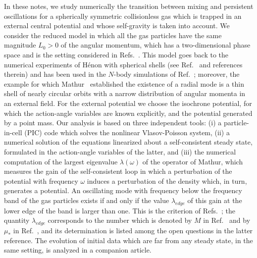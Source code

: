 In these notes, we study numerically the transition between mixing and persistent oscillations for a spherically symmetric collisionless gas which is trapped in an external central potential and whose self-gravity is taken into account. We consider the reduced model in which all the gas particles have the same magnitude $L_0 > 0$ of the angular momentum, which has a two-dimensional phase space and is the setting considered in Refs.~\cite{pRoS20,mHgRmScS25}. This model goes back to the numerical experiments of H\'enon with spherical shells (see Ref.~\cite{mH73} and references therein) and has been used in the $N$-body simulations of Ref.~\cite{pKbM02}; moreover, the example for which Mathur~\cite{sM90} established the existence of a radial mode is a thin shell of nearly circular orbits with a narrow distribution of angular momenta in an external field. For the external potential we choose the isochrone potential, for which the action-angle variables are known explicitly, and the potential generated by a point mass. Our analysis is based on three independent tools: (i) a particle-in-cell (PIC) code which solves the nonlinear Vlasov-Poisson system, (ii) a numerical solution of the equations linearized about a self-consistent steady state, formulated in the action-angle variables of the latter, and (iii) the numerical computation of the largest eigenvalue $\lambda(\omega)$ of the operator of Mathur, which measures the gain of the self-consistent loop in which a perturbation of the potential with frequency $\omega$ induces a perturbation of the density which, in turn, generates a potential. An oscillating mode with frequency below the frequency band of the gas particles exists if and only if the value $\lambda_{edge}$ of this gain at the lower edge of the band is larger than one. This is the criterion of Refs.~\cite{sM90,mHgRcS22,mK22}; the quantity $\lambda_{edge}$ corresponds to the number which is denoted by $M$ in Ref.~\cite{mHgRcS22} and by $\mu_*$ in Ref.~\cite{mK22}, and its determination is listed among the open questions in the latter reference. The evolution of initial data which are far from any steady state, in the same setting, is analyzed in a companion article.

